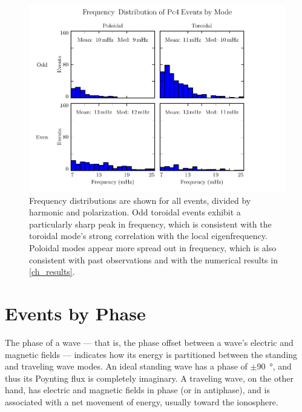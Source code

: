 \begin{figure}[!htb]
    \centering
    \includegraphics[width=\textwidth]{figures/f.pdf}
    \caption[Frequency Distribution of Pc4 Events by Mode]{
      Frequency distributions are shown for all events, divided by harmonic and polarization. Odd toroidal events exhibit a particularly sharp peak in frequency, which is consistent with the toroidal mode's strong correlation with the local eigenfrequency. Poloidal modes appear more spread out in frequency, which is also consistent with past observations and with the numerical results in \cref{ch_results}. 
    }
    \label{fig_f}
\end{figure}


\section{Events by Phase}
  \label{sec_phase}

The phase of a wave --- that is, the phase offset between a wave's electric and magnetic fields --- indicates how its energy is partitioned between the standing and traveling wave modes. An ideal standing wave has a phase of $\pm$\SI{90}{\degree}, and thus its Poynting flux is completely imaginary. A traveling wave, on the other hand, has electric and magnetic fields in phase (or in antiphase), and is associated with a net movement of energy, usually toward the ionosphere. 

